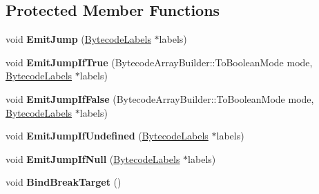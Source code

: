 \subsection*{Protected Member Functions}
\begin{DoxyCompactItemize}
\item 
\mbox{\label{classv8_1_1internal_1_1interpreter_1_1BreakableControlFlowBuilder_ac2d6bf7863cabdb0869aa9001338feb0}} 
void {\bfseries Emit\+Jump} (\mbox{\hyperlink{classv8_1_1internal_1_1interpreter_1_1BytecodeLabels}{Bytecode\+Labels}} $\ast$labels)
\item 
\mbox{\label{classv8_1_1internal_1_1interpreter_1_1BreakableControlFlowBuilder_a6ffb3f15536938b1be9d3cac1aa66656}} 
void {\bfseries Emit\+Jump\+If\+True} (Bytecode\+Array\+Builder\+::\+To\+Boolean\+Mode mode, \mbox{\hyperlink{classv8_1_1internal_1_1interpreter_1_1BytecodeLabels}{Bytecode\+Labels}} $\ast$labels)
\item 
\mbox{\label{classv8_1_1internal_1_1interpreter_1_1BreakableControlFlowBuilder_a9a7757131da38447e753b134d2ee4d42}} 
void {\bfseries Emit\+Jump\+If\+False} (Bytecode\+Array\+Builder\+::\+To\+Boolean\+Mode mode, \mbox{\hyperlink{classv8_1_1internal_1_1interpreter_1_1BytecodeLabels}{Bytecode\+Labels}} $\ast$labels)
\item 
\mbox{\label{classv8_1_1internal_1_1interpreter_1_1BreakableControlFlowBuilder_a5b2bd24738f3ad4c1177a6e7869753b8}} 
void {\bfseries Emit\+Jump\+If\+Undefined} (\mbox{\hyperlink{classv8_1_1internal_1_1interpreter_1_1BytecodeLabels}{Bytecode\+Labels}} $\ast$labels)
\item 
\mbox{\label{classv8_1_1internal_1_1interpreter_1_1BreakableControlFlowBuilder_a95c6a22e3731e9debb51bd83c2347bcf}} 
void {\bfseries Emit\+Jump\+If\+Null} (\mbox{\hyperlink{classv8_1_1internal_1_1interpreter_1_1BytecodeLabels}{Bytecode\+Labels}} $\ast$labels)
\item 
\mbox{\label{classv8_1_1internal_1_1interpreter_1_1BreakableControlFlowBuilder_a4bf60a2d400acd42265c5a75e92380be}} 
void {\bfseries Bind\+Break\+Target} ()
\end{DoxyCompactItemize}
